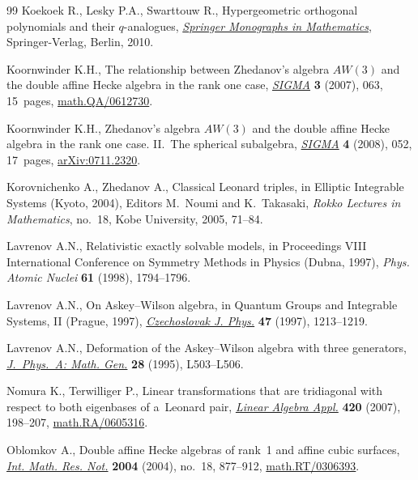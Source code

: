 \documentclass[pdftex]{sigma}
\numberwithin{equation}{section}
\begin{document}
\begin{thebibliography}{99}
Koekoek R., Lesky P.A., Swarttouw R.,
Hypergeometric orthogonal polynomials and their $q$-analogues,
\href{http://dx.doi.org/10.1007/978-3-642-05014-5}{{\it  Springer Monographs in Mathematics}}, Springer-Verlag, Berlin, 2010.


Koornwinder K.H.,
 The relationship between Zhedanov's algebra $AW(3)$ and the double af\/f\/ine Hecke algebra in the rank one case,
\href{http://dx.doi.org/10.3842/SIGMA.2007.063}{{\it SIGMA}} {\bf 3}  (2007), 063, 15~pages,
\href{http://arxiv.org/abs/math.QA/0612730}{math.QA/0612730}.


Koornwinder K.H.,
Zhedanov's algebra $AW(3)$ and the double af\/f\/ine Hecke algebra in the rank one case. II.~The spherical subalgebra,
\href{http://dx.doi.org/10.3842/SIGMA.2008.052}{{\it SIGMA}} {\bf 4}  (2008), 052, 17~pages,
\href{http://arxiv.org/abs/0711.2320}{arXiv:0711.2320}.

Korovnichenko A., Zhedanov A.,
Classical Leonard triples,
in Elliptic Integrable Systems (Kyoto, 2004), Editors M.~Noumi and K.~Takasaki,
{\it Rokko Lectures in Mathematics}, no.~18, Kobe University, 2005, 71--84.


Lavrenov A.N.,
Relativistic exactly solvable models,
in Proceedings VIII International Conference on Symmetry Methods in Physics (Dubna, 1997),
{\it Phys. Atomic Nuclei} {\bf 61} (1998), 1794--1796.

Lavrenov A.N.,
On Askey--Wilson algebra,
in Quantum Groups and Integrable Systems, II (Prague, 1997),
\href{http://dx.doi.org/10.1023/A:1022821531517}{{\it Czechoslovak J. Phys.}} {\bf 47} (1997), 1213--1219.


Lavrenov A.N.,
Deformation of the Askey--Wilson algebra with three generators,
\href{http://dx.doi.org/10.1088/0305-4470/28/20/001}{{\it J.~Phys.~A: Math. Gen.}} {\bf 28} (1995),  L503--L506.


Nomura K., Terwilliger P.,
Linear transformations that are tridiagonal with respect to both eigenbases of a~Leonard pair,
\href{http://dx.doi.org/10.1016/j.laa.2006.07.004}{{\it Linear Algebra Appl.}} {\bf 420} (2007), 198--207,
\href{http://arxiv.org/abs/math.RA/0605316}{math.RA/0605316}.

Oblomkov A.,
Double af\/f\/ine Hecke algebras of rank~1 and af\/f\/ine cubic surfaces,
\href{http://dx.doi.org/10.1155/S1073792804133072}{{\it Int. Math. Res. Not.}} {\bf 2004} (2004), no.~18, 877--912,
\href{http://arxiv.org/abs/math.RT/0306393}{math.RT/0306393}.




\end{thebibliography}
\end{document}
